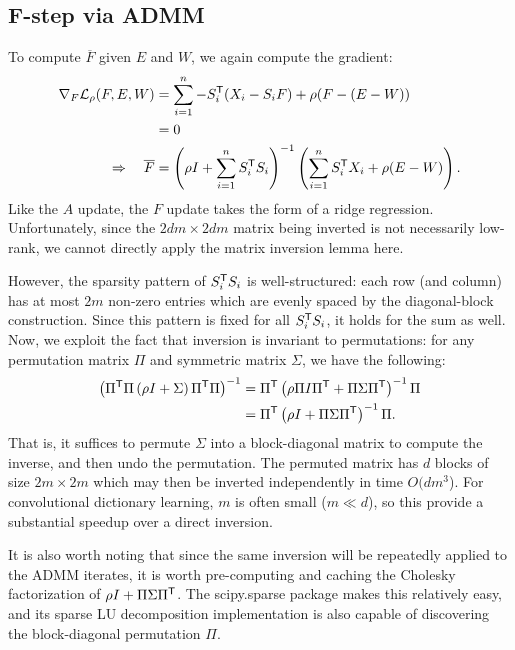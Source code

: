 \documentclass{article}
\begin{document}
\subsection{F-step via ADMM}
To compute $\overline{F}$ given $E$ and $W$, we again compute the gradient:
\begin{align*}
\nabla_F \mathcal{L}_\rho(F, E, W) &= \sum_{i=1}^n -S_i^\mathsf{T} (X_i - S_i F) + \rho (F - (E - W)
)\\
&= 0\\
\Rightarrow \quad \overline{F} &= \left(\rho I + \sum_{i=1}^n S_i^\mathsf{T} S_i
\right)^{-1} \left(\sum_{i=1}^n S_i^\mathsf{T} X_i + \rho(E - W) \right).
\end{align*}
Like the $A$ update, the $F$ update takes the form of a ridge regression.
Unfortunately, since the $2dm\times 2dm$ matrix being inverted is not necessarily low-rank, we cannot
directly apply the matrix inversion lemma here.

However, the sparsity pattern of $S_i^\mathsf{T} S_i$ is well-structured: each row (and column) has at most $2m$ non-zero entries which are evenly spaced by the diagonal-block construction.
Since this pattern is fixed for all $S_i^\mathsf{T} S_i$, it holds for the sum as well.  Now, we exploit the fact that inversion is invariant to permutations: for any permutation matrix
$\Pi$ and symmetric matrix $\Sigma$, we have the following:
\begin{align*}
\left(\Pi^\mathsf{T}\Pi\left(\rho I + \Sigma\right)\Pi^\mathsf{T}\Pi\right)^{-1} &= \Pi^\mathsf{T} \left( \rho\Pi I\Pi^\mathsf{T} + \Pi\Sigma\Pi^\mathsf{T} \right)^{-1} \Pi\\
&= \Pi^\mathsf{T} \left(\rho I + \Pi\Sigma\Pi^\mathsf{T} \right)^{-1}\Pi.
\end{align*}
That is, it suffices to permute $\Sigma$ into a block-diagonal matrix to compute the inverse, and then undo the permutation.  The permuted matrix has $d$ blocks of size $2m\times 2m$
which may then be inverted independently in time $O(dm^3$).  For convolutional dictionary learning, $m$ is often small ($m \ll d$), so this provide a substantial speedup over a direct
inversion.  

It is also worth noting that since the same inversion will be repeatedly applied to the ADMM iterates, it is worth pre-computing and caching the Cholesky factorization of 
${\rho I + \Pi\Sigma\Pi^\mathsf{T}}$.  The scipy.sparse package makes this relatively easy, and its sparse LU decomposition implementation is also capable of discovering the block-diagonal
permutation $\Pi$.
\end{document}
